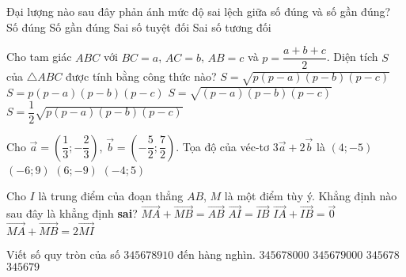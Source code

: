 \begin{ex}%
	Đại lượng nào sau đây phản ánh mức độ sai lệch giữa số đúng và số gần đúng?
	\choice
	{Số đúng}
	{Số gần đúng}
	{\True Sai số tuyệt đối}
	{Sai số tương đối}
\end{ex}

\begin{ex}%
	Cho tam giác $ABC$ với $BC=a$, $AC=b$, $AB=c$ và $p=\dfrac{a+b+c}{2}$. Diện tích $S$ của $\triangle ABC$ được tính bằng công thức nào?
	\choice
	{\True $S=\sqrt{p(p-a)(p-b)(p-c)}$}
	{$S=p(p-a)(p-b)(p-c)$}
	{$S=\sqrt{(p-a)(p-b)(p-c)}$}
	{$S=\dfrac{1}{2}\sqrt{p(p-a)(p-b)(p-c)}$}
\end{ex}

\begin{ex}%
	Cho $\vec{a}=\left(\dfrac{1}{3};-\dfrac{2}{3}\right)$, $\vec{b}=\left(-\dfrac{5}{2};\dfrac{7}{2}\right)$. Tọa độ của véc-tơ $3\vec{a}+2\vec{b}$ là
	\choice
	{$(4;-5)$}
	{$(-6;9)$}
	{$(6;-9)$}
	{\True $(-4;5)$}
\end{ex}

\begin{ex}%
	Cho $I$ là trung điểm của đoạn thẳng $AB$, $M$ là một điểm tùy ý. Khẳng định nào sau đây là khẳng định \textbf{sai}?
	\choice
	{\True $\overrightarrow{MA}+\overrightarrow{MB}=\overrightarrow{AB}$}
	{$\overrightarrow{AI}=\overrightarrow{IB}$}
	{ $\overrightarrow{IA}+\overrightarrow{IB}=\vec{0}$}
	{$\overrightarrow{MA}+\overrightarrow{MB}=2\overrightarrow{MI}$}
\end{ex}

\begin{ex}%
	Viết số quy tròn của số $345678910$ đến hàng nghìn.
	\choice
	{$345678000$}
	{\True $345679000$}
	{$345678$}
	{$345679$}
\end{ex}

